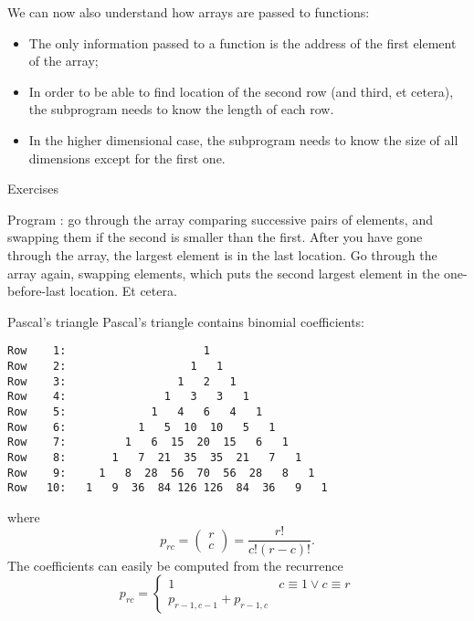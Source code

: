 We can now also understand how arrays are passed to functions:
\begin{itemize}
\item The only information passed to a function is the address of the
  first element of the array;
\item In order to be able to find location of the second row (and
  third, et cetera), the subprogram needs to know the length of each
  row.
\item In the higher dimensional case, the subprogram needs to know the
  size of all dimensions except for the first one.
\end{itemize}

 {Exercises}

\begin{exercise}
  Program : go through the array comparing
  successive pairs of elements, and swapping them if the second is
  smaller than the first. After you have gone through the array, the
  largest element is in the last location. Go through the array again,
  swapping elements, which puts the second largest element in the
  one-before-last location. Et cetera.
\end{exercise}

\begin{block}{Pascal's triangle}
  \label{sl:pascal-def}
  \small
  Pascal's triangle contains binomial coefficients:
\begin{verbatim}
Row    1:                     1
Row    2:                   1   1
Row    3:                 1   2   1
Row    4:               1   3   3   1
Row    5:             1   4   6   4   1
Row    6:           1   5  10  10   5   1
Row    7:         1   6  15  20  15   6   1
Row    8:       1   7  21  35  35  21   7   1
Row    9:     1   8  28  56  70  56  28   8   1
Row   10:   1   9  36  84 126 126  84  36   9   1
\end{verbatim}
where \[ p_{rc} = \begin{pmatrix} r\\c \end{pmatrix} = \frac{r!}{c!(r-c)! }. \]
The coefficients can easily be computed from the recurrence
\[ p_{rc} = 
\begin{cases}
  1&c\equiv 1\vee c\equiv r\\
  p_{r-1,c-1}+p_{r-1,c}
\end{cases}
\]
\end{block}

